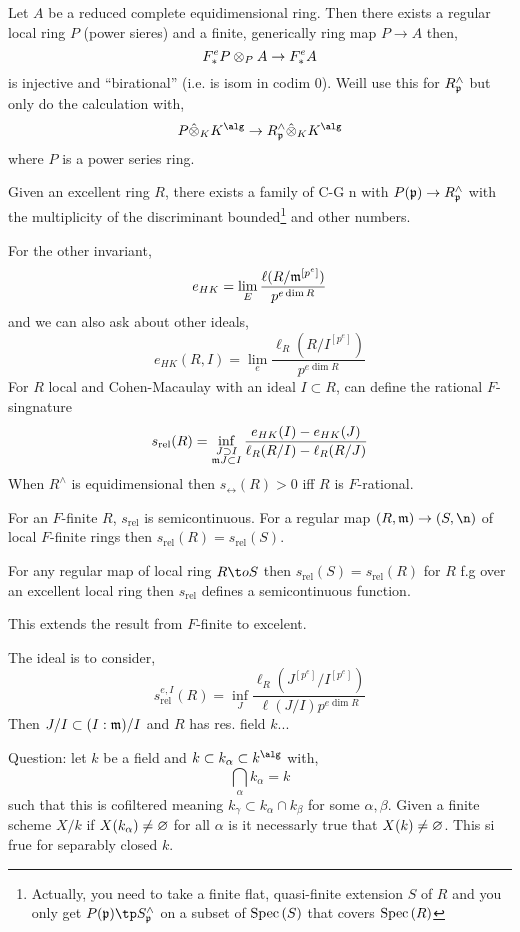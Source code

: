 \documentclass[12pt]{article}
\begin{document}
Let $A$ be a reduced complete equidimensional ring. Then there exists a regular local ring $P$ (power sieres) and a finite, generically \etale ring map $P \to A$ then,
\[ F^e_* P \otimes_P A \to F^e_* A \]
is injective and ``birational'' (i.e. is isom in codim $0$). Weill use this for $R_{\mathfrak{p}}^{\wedge}$ but only do the calculation with,
\[ P \hat{\ot}_K K^{\alg} \to R^{\wedge}_\p \hat{\ot}_K K^\alg \]
where $P$ is a power series ring.

\begin{prop}
Given an excellent ring $R$, there exists a family of C-G n with $P(\mathfrak{p}) \to R_{\mathfrak{p}}^{\wedge}$ with the multiplicity of the discriminant bounded\footnote{Actually, you need to take a finite flat, quasi-finite extension $S$ of $R$ and you only get $P(\p) \tp S_\p^{\wedge}$ on a subset of $\mathrm{Spec}\left( S \right)$ that covers $\mathrm{Spec}\left( R \right)$} and other numbers. 
\end{prop}

For the other invariant,
\[ e_{HK} = \lim_E \frac{\ell(R / \mathfrak{m}^{[p^e]})}{p^{e \dim{R}}} \]
and we can also ask about other ideals,
\[ e_{HK}(R, I) = \lim_e \frac{\ell_R(R/I^{[p^e]})}{p^{e \dim{R}}} \]
For $R$ local and Cohen-Macaulay with an ideal $I \subset R$, can define the rational $F$-singnature
\[ s_{\text{rel}}(R) = \inf_{\substack{ J \supset I \\ \mathfrak{m} J \subset I}} \frac{e_{HK}(I) - e_{HK}(J)}{\ell_R(R/I) - \ell_R(R/J)} \]
When $R^{\wedge}$ is equidimensional then $s_{\rel}(R) > 0$ iff $R$ is $F$-rational.

\begin{theorem}
For an $F$-finite $R$, $s_{\text{rel}}$ is semicontinuous. For a regular map $(R, \m) \to (S, \n)$ of local $F$-finite rings then $s_{\text{rel}}(R) = s_{\text{rel}}(S)$. 
\end{theorem}

\begin{theorem}
For any regular map of local ring $R \t oS$ then $s_{\text{rel}}(S) = s_{\text{rel}}(R)$ for $R$ f.g over an excellent local ring then $s_{\text{rel}}$ defines a semicontinuous function.
\end{theorem}

\begin{rmk}
This extends the result from $F$-finite to excelent. 
\end{rmk}

\begin{rmk}
The ideal is to consider,
\[ s_{\text{rel}}^{e,I}(R) = \inf_J \frac{\ell_R(J^{[p^e]} / I^{[p^e]})}{\ell(J/I) p^{e \dim{R}}} \]
Then $J/I \subset (I : \mathfrak{m}) / I$ and $R$ has res. field $k$...
\end{rmk}

\begin{rmk}
Question: let $k$ be a field and $k \subset k_\alpha \subset k^\alg$ with,
\[ \bigcap_\alpha k_\alpha = k \]
such that this is cofiltered meaning $k_\gamma \subset k_\alpha \cap k_\beta$ for some $\alpha, \beta$.
Given a finite scheme $X / k$ if $X(k_\alpha) \neq \varnothing$ for all $\alpha$ is it necessarly true that $X(k) \neq \varnothing$. This si frue for separably closed $k$. 
\end{rmk}
\end{document}
